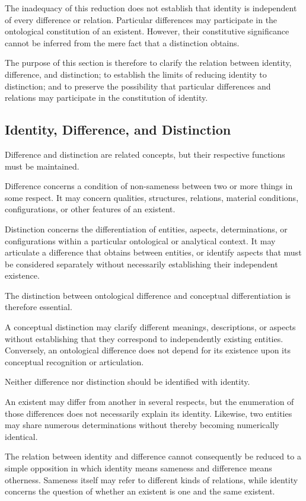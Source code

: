 The inadequacy of this reduction does not establish
that identity is independent of every difference
or relation. Particular differences may participate
in the ontological constitution of an existent.
However, their constitutive significance cannot
be inferred from the mere fact that a distinction
obtains.

The purpose of this section is therefore to clarify
the relation between identity, difference, and
distinction; to establish the limits of reducing
identity to distinction; and to preserve the
possibility that particular differences and
relations may participate in the constitution
of identity.

\subsection{Identity, Difference, and Distinction}

Difference and distinction are related concepts,
but their respective functions must be maintained.

Difference concerns a condition of non-sameness
between two or more things in some respect.
It may concern qualities, structures, relations,
material conditions, configurations, or other
features of an existent.

Distinction concerns the differentiation of entities,
aspects, determinations, or configurations within
a particular ontological or analytical context.
It may articulate a difference that obtains between
entities, or identify aspects that must be considered
separately without necessarily establishing their
independent existence.

The distinction between ontological difference
and conceptual differentiation is therefore
essential.

A conceptual distinction may clarify different
meanings, descriptions, or aspects without
establishing that they correspond to independently
existing entities. Conversely, an ontological
difference does not depend for its existence
upon its conceptual recognition or articulation.

Neither difference nor distinction should be
identified with identity.

An existent may differ from another in several
respects, but the enumeration of those differences
does not necessarily explain its identity.
Likewise, two entities may share numerous
determinations without thereby becoming
numerically identical.

The relation between identity and difference
cannot consequently be reduced to a simple
opposition in which identity means sameness
and difference means otherness. Sameness itself
may refer to different kinds of relations, while
identity concerns the question of whether an
existent is one and the same existent.


